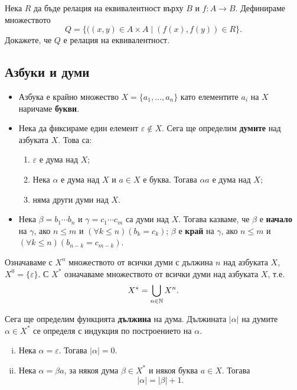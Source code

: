 \begin{problem}
  Нека $R$ да бъде релация на еквивалентност върху $B$ и $f:A\to B$.
  Дефинираме множеството 
  \[Q = \{((x,y)\in A\times A\mid (f(x),f(y))\in R\}.\]
  Докажете, че $Q$ е релация на еквивалентност.
\end{problem}


\subsection*{Азбуки и думи}

\begin{itemize}
\item
  Азбука е крайно множество $X = \{a_1,\dots,a_n\}$ като елементите $a_i$ на $X$ наричаме {\bf букви}.
\item
  Нека да фиксираме един елемент $\varepsilon \not\in X$.
  Сега ще определим {\bf думите} над азбуката $X$. Това са:
  \begin{enumerate}[1)]
  \item
    $\varepsilon$ е дума над $X$;
  \item
    Нека $\alpha$ е дума над $X$ и $a \in X$ е буква.
    Тогава $\alpha a$ е дума над $X$;
  \item
    няма други думи над $X$.
  \end{enumerate}
\item
  Нека $\beta=b_{1}\cdots b_{n}$ и $\gamma=c_{1}\cdots c_{m}$ са думи над $X$.
  Тогава казваме, че 
  $\beta$ е {\bf начало} на $\gamma$, ако $n\leq m$ и $(\forall k\leq n)(b_{k} = c_{k})$;
  $\beta$ е {\bf край} на $\gamma$, ако $n \leq m$ и $(\forall k\leq n)(b_{n-k} = c_{m-k})$.
\end{itemize}
Означаваме с $X^n$ множеството от всички думи с дължина $n$ над азбуката $X$, $X^0 = \{\varepsilon\}$.
С $X^{*}$ означаваме множеството от всички думи над азбуката $X$, т.е.
\marginpar{$0 \in \Nat$}
\[X^{*} = \bigcup_{n\in\mathbb{N}} X^{n}.\]

Сега ще определим функцията {\bf дължина} на дума.
Дължината $|\alpha|$ на думите $\alpha \in X^*$ се определя с индукция по построението на $\alpha$.
\begin{enumerate}[(i)]
  \item
    Нека $\alpha = \varepsilon$. Тогава $|\alpha| = 0$.
  \item
    Нека $\alpha = \beta a$, за някоя дума $\beta\in X^*$ и някоя буква $a\in X$.
    Тогава \[|\alpha| = |\beta| + 1.\]
\end{enumerate}

